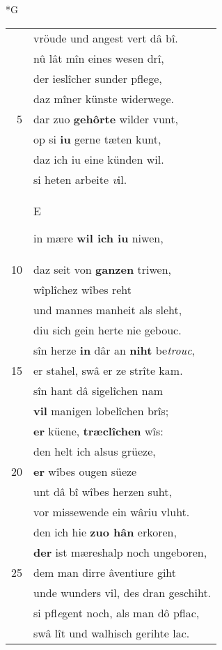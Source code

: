 \documentclass[8pt,a4paper,notitlepage]{article}
\begin{document}
\begin{table}[ht]
\begin{minipage}[t]{0.5\linewidth}
\small
\begin{center}*G
\end{center}
\begin{tabular}{rl}
 & vröude und angest vert dâ bî.\\ 
 & nû lât mîn eines wesen drî,\\ 
 & der ieslîcher sunder pflege,\\ 
 & daz mîner künste widerwege.\\ 
5 & dar zuo \textbf{gehôrte} wilder vunt,\\ 
 & op si \textbf{iu} gerne tæten kunt,\\ 
 & daz ich iu eine künden wil.\\ 
 & si heten arbeite \textit{v}il.\\ 
 & \begin{large}E\end{large}in mære \textbf{wil ich iu} niwen,\\ 
10 & daz seit von \textbf{ganzen} triwen,\\ 
 & wîplîchez wîbes reht\\ 
 & und mannes manheit als sleht,\\ 
 & diu sich gein herte nie gebouc.\\ 
 & sîn herze \textbf{in} dâr an \textbf{niht} be\textit{trouc},\\ 
15 & er stahel, swâ er ze strîte kam.\\ 
 & sîn hant dâ sigelîchen nam\\ 
 & \textbf{vil} manigen lobelîchen brîs;\\ 
 & \textbf{er} küene, \textbf{træclîchen} wîs:\\ 
 & den helt ich alsus grüeze,\\ 
20 & \textbf{er} wîbes ougen süeze\\ 
 & unt dâ bî wîbes herzen suht,\\ 
 & vor missewende ein wâriu vluht.\\ 
 & den ich hie \textbf{zuo hân} erkoren,\\ 
 & \textbf{der} ist mæreshalp noch ungeboren,\\ 
25 & dem man dirre âventiure giht\\ 
 & unde wunders vil, des dran geschiht.\\ 
 & si pfl\textit{e}gent noch, als man dô pflac,\\ 
 & swâ lît und walhisch gerihte lac.\\ 

\end{tabular}
\end{minipage}
\end{table}
\end{document}
